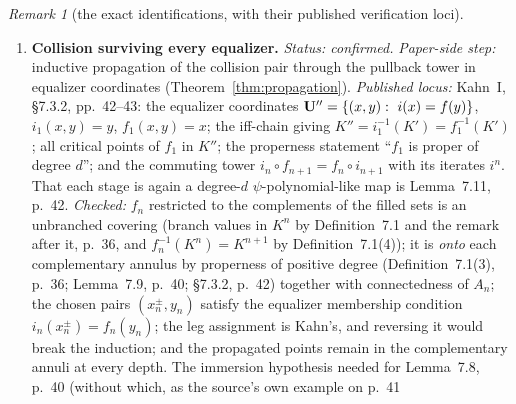 \documentclass[11pt,reqno]{amsart}
\theoremstyle{definition}
\theoremstyle{remark}
\newtheorem{remark}[theorem]{Remark}
\begin{document}
\begin{remark}[the exact identifications, with their published verification loci]
\begin{enumerate}
(Proposition~\ref{prop:excess}, Theorem~\ref{thm:excess-count}).
\emph{Published locus:} nesting and properness of the seed, Kahn~I,
\S6, p.~31 (\(U^r=f^{-r}(U^0)\), each \(f\colon U^{r+1}\to U^r\)
quadratic-like, so \(F=f^p\) is proper of degree \(2^p\)); the little
filled Julia sets \(K_p\), \(K_p(j)=f^j(K_p)\), \(\KK_p\), and
primitivity as pairwise disjointness, Kahn~I, \S1.1; the canonical
choice \(A=K_p\), \(B=\KK_p\) for \((i^p,f^p)\) with central local
degree two, Kahn~I, \S7.4.3, p.~45; and the removal asymmetry, which
is literally Kahn's \(T=(\BU\sm B)\cup A\) against
\(T'=(\BU'\sm f^{-1}B)\cup A'\), Kahn~I, \S7.4.2, p.~45.
\emph{Checked:} the central component has local degree two, so
\(2^p-2>0\) forces an excess component for \(p>1\); the invariance
\(F(K_p(j))=K_p(j)\) plus primitive disjointness gives
\(X\cap B=\varnothing\); and the source-side removal
\(X\subset F^{-1}B\) with target-side non-removal is exactly the
\(T'/T\) mismatch.  The construction meant throughout is the one of
\S7.4.3, not either variant of \S7.4.4, p.~46
(Definition~\ref{def:canonical}).
\item \textbf{Collision surviving every equalizer.}
\emph{Status: confirmed.}
\emph{Paper-side step:} inductive propagation of the collision pair
through the pullback tower in equalizer coordinates
(Theorem~\ref{thm:propagation}).
\emph{Published locus:} Kahn~I, \S7.3.2, pp.~42--43: the equalizer
coordinates \(\mathbf{U}''=\{(x,y):\ i(x)=f(y)\}\), \(i_1(x,y)=y\),
\(f_1(x,y)=x\); the iff-chain giving
\(K''=i_1^{-1}(K')=f_1^{-1}(K')\); all critical points of \(f_1\) in
\(K''\); the properness statement ``\(f_1\) is proper of degree
\(d\)''; and the commuting tower \(i_n\circ f_{n+1}=f_n\circ i_{n+1}\)
with its iterates \(i^n\).  That each stage is again a degree-\(d\)
\(\psi\)-polynomial-like map is Lemma~7.11, p.~42.
\emph{Checked:} \(f_n\) restricted to the complements of the filled
sets is an unbranched covering (branch values in \(K^n\) by
Definition~7.1 and the remark after it, p.~36, and
\(f_n^{-1}(K^n)=K^{n+1}\) by Definition~7.1(4)); it is \emph{onto}
each complementary annulus by properness of positive degree
(Definition~7.1(3), p.~36; Lemma~7.9, p.~40; \S7.3.2, p.~42) together
with connectedness of \(A_n\); the chosen pairs \((x_n^\pm,y_n)\)
satisfy the equalizer membership condition \(i_n(x_n^\pm)=f_n(y_n)\);
the leg assignment is Kahn's, and reversing it would break the
induction; and the propagated points remain in the complementary
annuli at every depth.  The immersion hypothesis needed for
Lemma~7.8, p.~40 (without which, as the source's own example on p.~41

\end{enumerate}
\end{remark}
\end{document}
